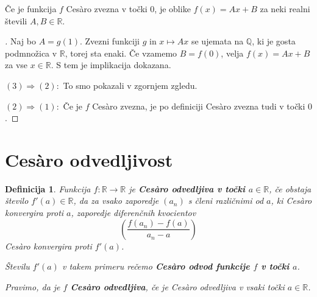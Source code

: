 \documentclass[10pt,hyperref={unicode}]{beamer}
\newtheorem{definicija}{Definicija}
\newenvironment{dokaz}{\begin{proof}[\bfseries\upshape\proofname]}{\end{proof}}
\begin{document}
\begin{frame}
    \begin{block}{}
        Če je funkcija $f$ Ces\`{a}ro zvezna v točki $0$, je oblike $f(x) = Ax + B$ za neki realni števili $A, B \in \mathbb{R}$.
    \end{block}
    \begin{dokaz}
        Naj bo $A = g(1)$. Zvezni funkciji $g$ in $x \mapsto Ax$ se ujemata na $\mathbb{Q}$, ki je gosta podmnožica v $\mathbb{R}$, torej sta enaki. Če vzamemo $B = f(0)$, velja $f(x) = Ax + B$ za vse $x \in \mathbb{R}$. S tem je implikacija dokazana.
        \pause

        \medskip
        $(3) \Rightarrow (2): $ To smo pokazali v zgornjem zgledu.
        \pause

        \medskip
        $(2) \Rightarrow (1): $ Če je $f$ Ces\`{a}ro zvezna, je po definiciji Ces\`{a}ro zvezna tudi v točki $0$.
    \end{dokaz}
\end{frame}



\section{Ces\`{a}ro odvedljivost}

\begin{frame}
    \begin{definicija}
        Funkcija $f: \mathbb{R} \rightarrow \mathbb{R}$ je \textbf{Ces\`{a}ro odvedljiva v točki $a \in \mathbb{R}$}, če obstaja število $f'(a) \in \mathbb{R}$, da za vsako zaporedje $(a_n)$ s členi različnimi od $a$, ki Ces\`{a}ro konvergira proti $a$, zaporedje diferenčnih kvocientov 
        $$\left( \frac{f(a_n)-f(a)}{a_n-a} \right)$$ 
        Ces\`{a}ro konvergira proti $f'(a)$. 
        \pause

        \medskip
        Številu $f'(a)$ v takem primeru rečemo \textbf{Ces\`{a}ro odvod funkcije $f$ v točki $a$}. 
        \pause

        \medskip
        Pravimo, da je $f$ \textbf{Ces\`{a}ro odvedljiva}, če je Ces\`{a}ro odvedljiva v vsaki točki $a \in \mathbb{R}$.
    \end{definicija}
\end{frame}
\end{document}
